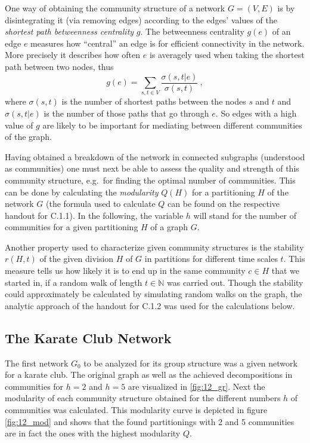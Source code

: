 \documentclass{scrartcl}
\begin{document}
One way of obtaining the community structure of a network $G = (V,E)$ is by
disintegrating it (via removing edges) according to the edges' values of
the \emph{shortest path betweenness centrality} $g$. The betweenness
centrality $g(e)$ of an edge $e$ measures how \enquote{central} an edge is
for efficient connectivity in the network. More precisely it describes how
often $e$ is averagely used when taking the shortest path between two
nodes, thus
\begin{equation}\label{eq:betweenness}
    g(e) = \sum_{s,t\in V} \frac{\sigma(s,t | e)}{\sigma(s,t)}~,
\end{equation}
where $\sigma(s,t)$ is the number of shortest paths between the nodes $s$
and $t$ and $\sigma(s,t |e)$ is the number of those paths that go through
$e$. So edges with a high value of $g$ are likely to be important for
mediating between different communities of the graph.

Having obtained a breakdown of the network in connected subgraphs
(understood as communities) one must next be able to assess the quality and
strength of this community structure, e.g.\ for finding the optimal
number of communities. This can be done by calculating the
\emph{modularity} $Q(H)$ for a partitioning $H$ of the network $G$ (the
formula used to calculate $Q$ can be found on the respective handout for
C.1.1).
In the following, the variable $h$ will stand for the number of communities
for a given partitioning $H$ of a graph $G$.

Another property used to characterize given community structures is 
the stability $r(H, t)$ of the given division $H$ of $G$ in
partitions for different time scales $t$. This measure tells us how likely
it is to end up in the same community $c\in H$ that we started in, if
a random walk of length $t\in\mathbb{N}$ was carried out. Though the
stability could approximately be calculated by simulating random walks on
the graph, the analytic approach of the handout for C.1.2 was used for the
calculations below.


\subsection{The Karate Club Network}
The first network $G_0$ to be analyzed for its group structure was a given
network for a karate club. The original graph as well as the achieved
decompositions in communities for $h=2$ and $h=5$ are visualized in
\ref{fig:12_gr}.
Next the modularity of each community structure obtained for the different
numbers $h$ of communities was calculated. This modularity curve is
depicted in figure \ref{fig:12_mod} and shows that the found partitionings
with 2 and 5 communities are in fact the ones with the highest modularity
$Q$.
\end{document}
